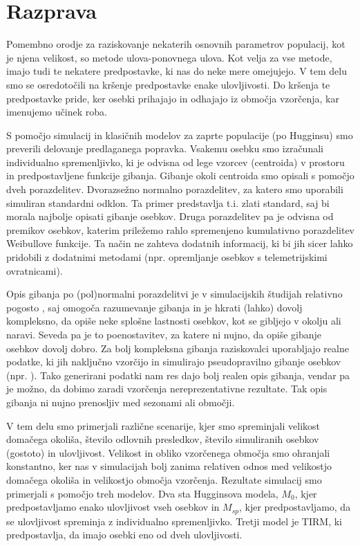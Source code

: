 \section{Razprava}

Pomembno orodje za raziskovanje nekaterih osnovnih parametrov populacij, kot je njena velikost, so metode ulova-ponovnega ulova. Kot velja za vse metode, imajo tudi te nekatere predpostavke, ki nas do neke mere omejujejo. V tem delu smo se osredotočili na kršenje predpostavke enake ulovljivosti. Do kršenja te predpostavke pride, ker osebki prihajajo in odhajajo iz območja vzorčenja, kar imenujemo učinek roba.

S pomočjo simulacij in klasičnih modelov za zaprte populacije (po Hugginsu) smo preverili delovanje predlaganega popravka. Vsakemu osebku smo izračunali individualno spremenljivko, ki je odvisna od lege vzorcev (centroida) v prostoru in predpostavljene funkcije gibanja. Gibanje okoli centroida smo opisali s pomočjo dveh porazdelitev. Dvorazsežno normalno porazdelitev, za katero smo uporabili simuliran standardni odklon.  Ta primer predstavlja t.i. zlati standard, saj bi morala najbolje opisati gibanje osebkov. Druga porazdelitev pa je odvisna od premikov osebkov, katerim priležemo rahlo spremenjeno kumulativno porazdelitev Weibullove funkcije. Ta način ne zahteva dodatnih informacij, ki bi jih sicer lahko pridobili z dodatnimi metodami (npr. opremljanje osebkov s telemetrijskimi ovratnicami).

Opis gibanja po (pol)normalni porazdelitvi je v simulacijskih študijah relativno pogosto \citep{bolker_ecological_2008, ivan_using_2013-1}, saj omogoča razumevanje gibanja in je hkrati (lahko) dovolj kompleksno, da opiše neke splošne lastnosti osebkov, kot se gibljejo v okolju ali naravi. Seveda pa je to poenostavitev, za katere ni nujno, da opiše gibanje osebkov dovolj dobro. Za bolj kompleksna gibanja raziskovalci uporabljajo realne podatke, ki jih naključno vzorčijo in simulirajo pseudopravilno gibanje osebkov (npr. \citet{manning_estimating_2010}). Tako generirani podatki nam res dajo bolj realen opis gibanja, vendar pa je možno, da dobimo zaradi vzorčenja nereprezentativne rezultate. Tak opis gibanja ni nujno prenosljiv med sezonami ali območji.

V tem delu smo primerjali različne scenarije, kjer smo spreminjali velikost domačega okoliša, število odlovnih presledkov, število simuliranih osebkov (gostoto) in ulovljivost. Velikost in obliko vzorčenega območja smo ohranjali konstantno, ker nas v simulacijah bolj zanima relativen odnos med velikostjo domačega okoliša in velikostjo območja vzorčenja. Rezultate simulacij smo primerjali s pomočjo treh modelov. Dva sta Hugginsova modela, $M_0$, kjer predpostavljamo enako ulovljivost vseh osebkov in $M_{sp}$, kjer predpostavljamo, da se ulovljivost spreminja z individualno spremenljivko. Tretji model je TIRM, ki predpostavlja, da imajo osebki eno od dveh ulovljivosti.

